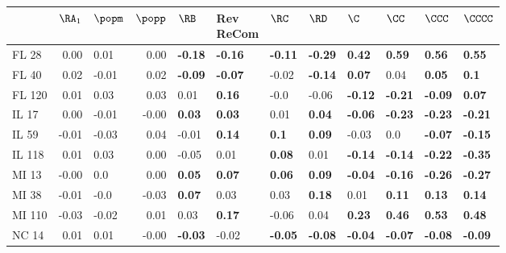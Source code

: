 \begin{tabular}{lrlrllllllll}
\toprule
{} &  $\RA_1$ &        $\popm$ &  $\popp$ &           $\RB$ & \makecell{Rev \\ ReCom} &           $\RC$ &           $\RD$ &            $\C$ &           $\CC$ &          $\CCC$ &         $\CCCC$ \\
\midrule
FL 28   &     0.00 &           0.01 &     0.00 &  \textbf{-0.18} &          \textbf{-0.16} &  \textbf{-0.11} &  \textbf{-0.29} &   \textbf{0.42} &   \textbf{0.59} &   \textbf{0.56} &   \textbf{0.55} \\
FL 40   &     0.02 &          -0.01 &     0.02 &  \textbf{-0.09} &          \textbf{-0.07} &           -0.02 &  \textbf{-0.14} &   \textbf{0.07} &            0.04 &   \textbf{0.05} &    \textbf{0.1} \\
FL 120  &     0.01 &           0.03 &     0.03 &            0.01 &           \textbf{0.16} &            -0.0 &           -0.06 &  \textbf{-0.12} &  \textbf{-0.21} &  \textbf{-0.09} &   \textbf{0.07} \\
IL 17   &     0.00 &          -0.01 &    -0.00 &   \textbf{0.03} &           \textbf{0.03} &            0.01 &   \textbf{0.04} &  \textbf{-0.06} &  \textbf{-0.23} &  \textbf{-0.23} &  \textbf{-0.21} \\
IL 59   &    -0.01 &          -0.03 &     0.04 &           -0.01 &           \textbf{0.14} &    \textbf{0.1} &   \textbf{0.09} &           -0.03 &             0.0 &  \textbf{-0.07} &  \textbf{-0.15} \\
IL 118  &     0.01 &           0.03 &     0.00 &           -0.05 &                    0.01 &   \textbf{0.08} &            0.01 &  \textbf{-0.14} &  \textbf{-0.14} &  \textbf{-0.22} &  \textbf{-0.35} \\
MI 13   &    -0.00 &            0.0 &     0.00 &   \textbf{0.05} &           \textbf{0.07} &   \textbf{0.06} &   \textbf{0.09} &  \textbf{-0.04} &  \textbf{-0.16} &  \textbf{-0.26} &  \textbf{-0.27} \\
MI 38   &    -0.01 &           -0.0 &    -0.03 &   \textbf{0.07} &                    0.03 &            0.03 &   \textbf{0.18} &            0.01 &   \textbf{0.11} &   \textbf{0.13} &   \textbf{0.14} \\
MI 110  &    -0.03 &          -0.02 &     0.01 &            0.03 &           \textbf{0.17} &           -0.06 &            0.04 &   \textbf{0.23} &   \textbf{0.46} &   \textbf{0.53} &   \textbf{0.48} \\
NC 14   &     0.01 &           0.01 &    -0.00 &  \textbf{-0.03} &                   -0.02 &  \textbf{-0.05} &  \textbf{-0.08} &  \textbf{-0.04} &  \textbf{-0.07} &  \textbf{-0.08} &  \textbf{-0.09} \\

\end{tabular}
